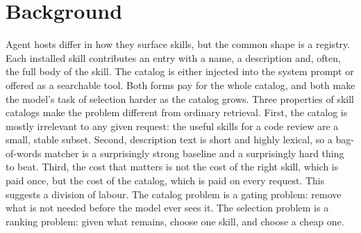 \documentclass[sigconf,acmsmall]{acmart}
\begin{document}
\section{Background}
Agent hosts differ in how they surface skills, but the common shape is a registry. Each installed skill contributes an entry with a name, a description and, often, the full body of the skill. The catalog is either injected into the system prompt or offered as a searchable tool. Both forms pay for the whole catalog, and both make the model's task of selection harder as the catalog grows.
Three properties of skill catalogs make the problem different from ordinary retrieval. First, the catalog is mostly irrelevant to any given request: the useful skills for a code review are a small, stable subset. Second, description text is short and highly lexical, so a bag-of-words matcher is a surprisingly strong baseline and a surprisingly hard thing to beat. Third, the cost that matters is not the cost of the right skill, which is paid once, but the cost of the catalog, which is paid on every request.
This suggests a division of labour. The catalog problem is a gating problem: remove what is not needed before the model ever sees it. The selection problem is a ranking problem: given what remains, choose one skill, and choose a cheap one.
\end{document}
